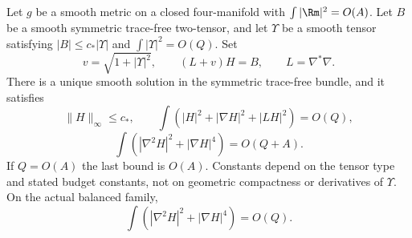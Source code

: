 \begin{lemma}\label{webvar:adaptive-test}
Let $g$ be a smooth metric on a closed four-manifold with
$\int|\Rm|^2=O(A)$.  Let $B$ be a smooth symmetric trace-free
two-tensor, and let $\Upsilon$ be a smooth tensor satisfying
$|B|\le c_*|\Upsilon|$ and $\int|\Upsilon|^2=O(Q)$.
Set
\begin{equation}\label{webvar:adaptive-equation}
 v=\sqrt{1+|\Upsilon|^2},\qquad (L+v)H=B,\qquad L=\nabla^*\nabla.
\end{equation}
There is a unique smooth solution in the symmetric trace-free bundle,
and it satisfies
\begin{equation}\label{webvar:adaptive-graph}
 \|H\|_\infty\le c_*,\qquad
 \int(|H|^2+|\nabla H|^2+|LH|^2)=O(Q),
\end{equation}
\begin{equation}\label{webvar:adaptive-critical-general}
 \int(|\nabla^2H|^2+|\nabla H|^4)=O(Q+A).
\end{equation}
If $Q=O(A)$ the last bound is $O(A)$.  Constants depend on the
tensor type and stated budget constants, not on geometric compactness
or derivatives of $\Upsilon$.  On the actual balanced family,
\begin{equation}\label{webvar:adaptive-critical-sharp}
 \int(|\nabla^2H|^2+|\nabla H|^4)=O(Q).
\end{equation}
\end{lemma}

